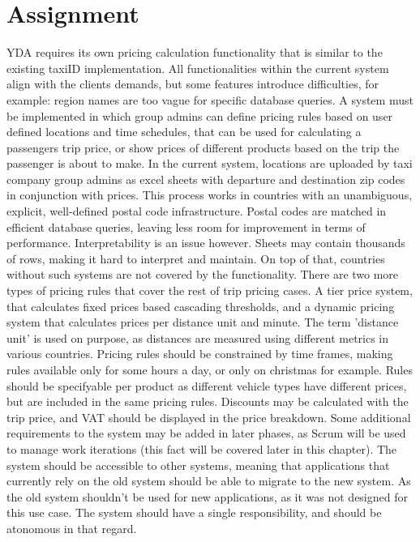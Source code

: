 \section{Assignment}
YDA requires its own pricing calculation functionality that is similar to the existing taxiID implementation. All functionalities within the current system align with the clients demands, but some features introduce difficulties, for example: region names are too vague for specific database queries. A system must be implemented in which group admins can define pricing rules based on user defined locations and time schedules, that can be used for calculating a passengers trip price, or show prices of different products based on the trip the passenger is about to make. In the current system, locations are uploaded by taxi company group admins as excel sheets with departure and destination zip codes in conjunction with prices. This process works in countries with an unambiguous, explicit, well-defined postal code infrastructure. Postal codes are matched in efficient database queries, leaving less room for improvement in terms of performance. Interpretability is an issue however. Sheets may contain thousands of rows, making it hard to interpret and maintain. On top of that, countries without such systems are not covered by the functionality. There are two more types of pricing rules that cover the rest of trip pricing cases. A tier price system, that calculates fixed prices based cascading thresholds, and a dynamic pricing system that calculates prices per distance unit and minute. The term 'distance unit' is used on purpose, as distances are measured using different metrics in various countries. Pricing rules should be constrained by time frames, making rules available only for some hours a day, or only on christmas for example. Rules should be specifyable per product as different vehicle types have different prices, but are included in the same pricing rules. Discounts may be calculated with the trip price, and VAT should be displayed in the price breakdown. Some additional requirements to the system may be added in later phases, as Scrum will be used to manage work iterations (this fact will be covered later in this chapter). The system should be accessible to other systems, meaning that applications that currently rely on the old system should be able to migrate to the new system. As the old system shouldn't be used for new applications, as it was not designed for this use case. The system should have a single responsibility, and should be atonomous in that regard.

